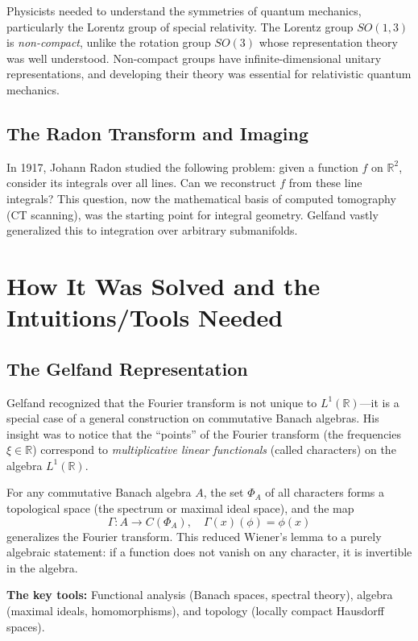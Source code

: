 Physicists needed to understand the symmetries of quantum mechanics, particularly the Lorentz group of special relativity. The Lorentz group $SO(1,3)$ is \textit{non-compact}, unlike the rotation group $SO(3)$ whose representation theory was well understood. Non-compact groups have infinite-dimensional unitary representations, and developing their theory was essential for relativistic quantum mechanics.

\subsection{The Radon Transform and Imaging}

In 1917, Johann Radon studied the following problem: given a function $f$ on $\mathbb{R}^2$, consider its integrals over all lines. Can we reconstruct $f$ from these line integrals? This question, now the mathematical basis of computed tomography (CT scanning), was the starting point for integral geometry. Gelfand vastly generalized this to integration over arbitrary submanifolds.

\section{How It Was Solved and the Intuitions/Tools Needed}

\subsection{The Gelfand Representation}

Gelfand recognized that the Fourier transform is not unique to $L^1(\mathbb{R})$---it is a special case of a general construction on commutative Banach algebras. His insight was to notice that the ``points'' of the Fourier transform (the frequencies $\xi \in \mathbb{R}$) correspond to \textit{multiplicative linear functionals} (called characters) on the algebra $L^1(\mathbb{R})$.

For any commutative Banach algebra $A$, the set $\Phi_A$ of all characters forms a topological space (the spectrum or maximal ideal space), and the map
\[
\Gamma: A \to C(\Phi_A), \quad \Gamma(x)(\phi) = \phi(x)
\]
generalizes the Fourier transform. This reduced Wiener's lemma to a purely algebraic statement: if a function does not vanish on any character, it is invertible in the algebra.

\textbf{The key tools:} Functional analysis (Banach spaces, spectral theory), algebra (maximal ideals, homomorphisms), and topology (locally compact Hausdorff spaces).

